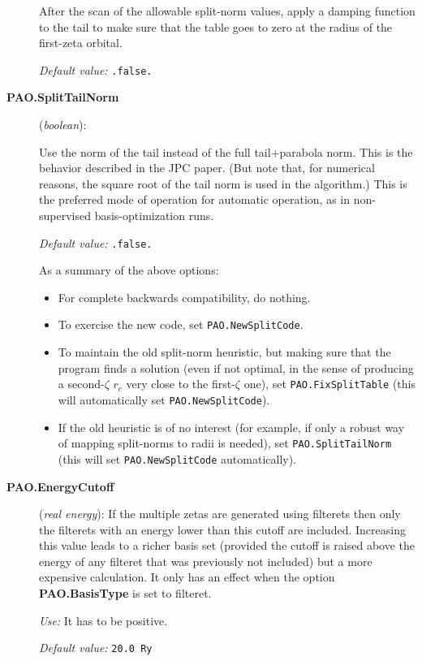 \documentclass[11pt]{article}
\begin{document}
\begin{description}
After the scan of the allowable split-norm values, apply a damping
function to the tail to make sure that the table goes to zero at
the radius of the first-zeta orbital.

{\it Default value:} {\tt .false.}

\item[{\bf PAO.SplitTailNorm}] ({\it boolean}):

Use the norm of the tail instead of the full tail+parabola
norm. This is the behavior described in the JPC paper. (But note
that, for numerical reasons, the square root of the tail norm is used
in the algorithm.) This is the preferred mode of operation for
automatic operation, as in non-supervised basis-optimization runs.

{\it Default value:} {\tt .false.}

As a summary of the above options:
\begin{itemize}
\item For complete backwards compatibility, do nothing.
\item To exercise the new code, set {\tt PAO.NewSplitCode}.
\item To maintain the old split-norm heuristic, but
making sure that the program finds a solution (even
if not optimal, in the sense of producing a second-$\zeta$ $r_c$
very close to the first-$\zeta$ one), set {\tt PAO.FixSplitTable}
(this will automatically set {\tt PAO.NewSplitCode}).
\item If the old heuristic is of no interest (for example, if
only a robust way of mapping split-norms to radii is needed), set
{\tt PAO.SplitTailNorm} (this will set {\tt PAO.NewSplitCode}
automatically).
\end{itemize}

\end{description}

\begin{description}
\item[{\bf PAO.EnergyCutoff}] ({\it real energy}): If the multiple
zetas are generated using filterets then only the filterets with
an energy lower than this cutoff are included. Increasing this
value leads to a richer basis set (provided the cutoff is raised
above the energy of any filteret that was previously not included)
but a more expensive calculation.
It only has an effect when the option
{\bf PAO.BasisType} is set to filteret.

{\it Use:} It has to be positive.

{\it Default value:} {\tt 20.0 Ry}
\end{description}
\end{document}
